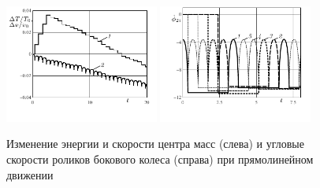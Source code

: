 \begin{figure}[H]
  \includegraphics[width=0.45\textwidth]{pic/figure6_1.pdf}
  \includegraphics[width=0.45\textwidth]{pic/figure6_2.pdf}
  \caption{Изменение энергии и скорости центра масс (слева) и угловые скорости роликов бокового колеса (справа) при прямолинейном движении}\label{fig:straight}
\end{figure}

